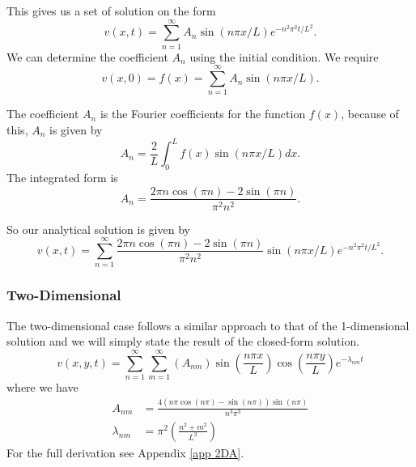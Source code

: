 \documentclass[%
reprint,
nofootinbib,
amsmath,amssymb,
aps,
]{revtex4-1}
\begin{document}
This gives us a set of solution on the form 
\begin{equation}
	v(x,t) = \sum_{n=1}^\infty A_n\sin(n\pi x/L)e^{-n^2\pi^2 t/L^2}.
\end{equation}
We can determine the coefficient $A_n$ using the initial condition. We require 
\begin{equation}
	v(x,0) = f(x) = \sum_{n=1}^\infty A_n\sin(n\pi x/L).
\end{equation}

The coefficient $A_n$ is the Fourier coefficients for the function $f(x)$\cite{morten}, because of this, $A_n$ is given by 
\begin{equation}
	A_n = \frac{2}{L}\int_0^L f(x)\sin(n\pi x/L)dx.
\end{equation}
The integrated form is 
\begin{equation}
	A_n = \frac{2\pi n \cos(\pi n) - 2\sin(\pi n)}{\pi^2n^2}.
\end{equation}

So our analytical solution is given by 
\begin{equation}\label{eq analytical 1d}
	v(x,t) = \sum_{n=1}^\infty \frac{2\pi n \cos(\pi n) - 2\sin(\pi n)}{\pi^2n^2}\sin(n\pi x/L)e^{-n^2\pi^2 t/L^2}.
\end{equation}

\subsubsection{Two-Dimensional}
The two-dimensional case follows a similar approach to that of the 1-dimensional solution and we will simply state the result of the closed-form solution. 
\begin{equation}
	v(x,y,t) = 
		\sum_{n = 1}^{\infty}\sum_{m=1}^{\infty}\left(A_{nm}\right)\sin\left(\frac{n\pi x}{L}\right)\cos\left(\frac{n\pi y}{L}\right)e^{-\lambda_{nm}t}
\end{equation}
where we have 
\begin{equation}
	\begin{split}
		A_{nm} &= \frac{4\left( n\pi\cos(n\pi) - \sin(n\pi)\right)\sin(n\pi)}{n^3\pi^3}\\
		\lambda_{nm} &= \pi^2\left(\frac{n^2+m^2}{L^2}\right)
	\end{split}
\end{equation}
For the full derivation see Appendix \ref{app 2DA}.
\end{document}
